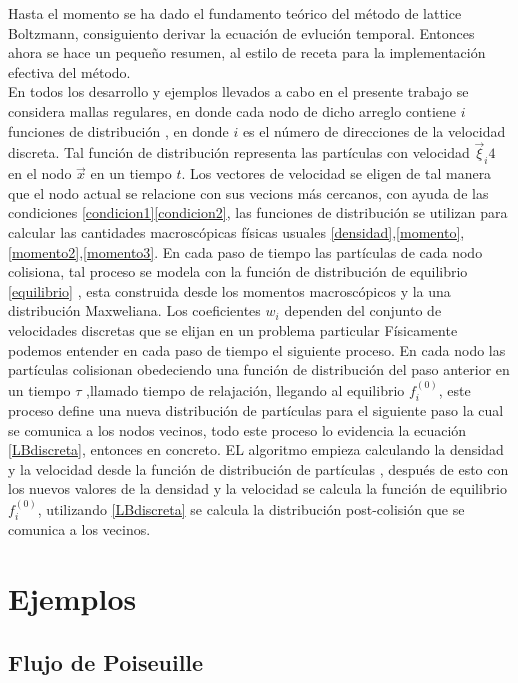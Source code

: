 \noindent Hasta el momento se ha dado el fundamento teórico del método de lattice Boltzmann, consiguiento derivar la ecuación de evlución temporal. Entonces ahora se hace un pequeño resumen, al estilo de receta para la implementación efectiva del método.
\\
\noindent En todos los desarrollo y ejemplos llevados a cabo en el presente trabajo se considera mallas regulares, en donde cada nodo de dicho arreglo contiene $i$ funciones de distribución , en donde $i$ es el número de direcciones de la velocidad discreta. Tal función de distribución representa las partículas con velocidad $\vec{\xi}_{i}4$ en el nodo $\vec{x}$  en un tiempo $t$. Los vectores de velocidad se eligen de tal manera que el nodo actual se relacione con sus vecions más cercanos, con ayuda de las condiciones \eqref{condicion1}\eqref{condicion2}, las funciones de distribución se utilizan para calcular las cantidades macroscópicas físicas usuales \eqref{densidad},\eqref{momento},\eqref{momento2},\eqref{momento3}. En cada paso de tiempo las partículas de cada nodo colisiona, tal proceso se modela  con la función de distribución de equilibrio \eqref{equilibrio} , esta construida desde los momentos macroscópicos y la una distribución Maxweliana. Los coeficientes $w_{i}$ dependen del conjunto de velocidades discretas que se elijan en un problema particular
\noindent Físicamente podemos entender en cada paso de tiempo el siguiente proceso. En cada nodo las partículas colisionan obedeciendo una función de distribución del paso anterior en un tiempo $\tau$ ,llamado tiempo de relajación, llegando al equilibrio $f_{i}^{(0)}$, este proceso define una nueva distribución de partículas para el siguiente paso la cual se comunica a los nodos vecinos, todo este proceso lo evidencia la ecuación \eqref{LBdiscreta}, entonces en concreto. EL algoritmo empieza calculando la densidad y la velocidad desde la función de distribución de partículas , después de esto con los nuevos valores de la densidad y la velocidad se calcula la función de equilibrio $f_{i}^{(0)}$, utilizando \eqref{LBdiscreta} se calcula la distribución post-colisión que se comunica a los vecinos. 

\section{Ejemplos}

\subsection{Flujo de Poiseuille}

